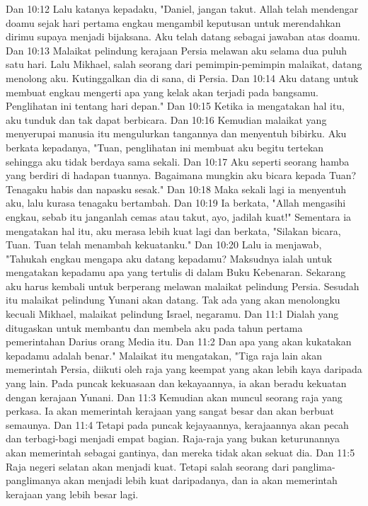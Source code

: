 Dan 10:12  Lalu katanya kepadaku, "Daniel, jangan takut. Allah telah mendengar doamu sejak hari pertama engkau mengambil keputusan untuk merendahkan dirimu supaya menjadi bijaksana. Aku telah datang sebagai jawaban atas doamu.
Dan 10:13  Malaikat pelindung kerajaan Persia melawan aku selama dua puluh satu hari. Lalu Mikhael, salah seorang dari pemimpin-pemimpin malaikat, datang menolong aku. Kutinggalkan dia di sana, di Persia.
Dan 10:14  Aku datang untuk membuat engkau mengerti apa yang kelak akan terjadi pada bangsamu. Penglihatan ini tentang hari depan."
Dan 10:15  Ketika ia mengatakan hal itu, aku tunduk dan tak dapat berbicara.
Dan 10:16  Kemudian malaikat yang menyerupai manusia itu mengulurkan tangannya dan menyentuh bibirku. Aku berkata kepadanya, "Tuan, penglihatan ini membuat aku begitu tertekan sehingga aku tidak berdaya sama sekali.
Dan 10:17  Aku seperti seorang hamba yang berdiri di hadapan tuannya. Bagaimana mungkin aku bicara kepada Tuan? Tenagaku habis dan napasku sesak."
Dan 10:18  Maka sekali lagi ia menyentuh aku, lalu kurasa tenagaku bertambah.
Dan 10:19  Ia berkata, "Allah mengasihi engkau, sebab itu janganlah cemas atau takut, ayo, jadilah kuat!" Sementara ia mengatakan hal itu, aku merasa lebih kuat lagi dan berkata, "Silakan bicara, Tuan. Tuan telah menambah kekuatanku."
Dan 10:20  Lalu ia menjawab, "Tahukah engkau mengapa aku datang kepadamu? Maksudnya ialah untuk mengatakan kepadamu apa yang tertulis di dalam Buku Kebenaran. Sekarang aku harus kembali untuk berperang melawan malaikat pelindung Persia. Sesudah itu malaikat pelindung Yunani akan datang. Tak ada yang akan menolongku kecuali Mikhael, malaikat pelindung Israel, negaramu.
Dan 11:1  Dialah yang ditugaskan untuk membantu dan membela aku pada tahun pertama pemerintahan Darius orang Media itu.
Dan 11:2  Dan apa yang akan kukatakan kepadamu adalah benar." Malaikat itu mengatakan, "Tiga raja lain akan memerintah Persia, diikuti oleh raja yang keempat yang akan lebih kaya daripada yang lain. Pada puncak kekuasaan dan kekayaannya, ia akan beradu kekuatan dengan kerajaan Yunani.
Dan 11:3  Kemudian akan muncul seorang raja yang perkasa. Ia akan memerintah kerajaan yang sangat besar dan akan berbuat semaunya.
Dan 11:4  Tetapi pada puncak kejayaannya, kerajaannya akan pecah dan terbagi-bagi menjadi empat bagian. Raja-raja yang bukan keturunannya akan memerintah sebagai gantinya, dan mereka tidak akan sekuat dia.
Dan 11:5  Raja negeri selatan akan menjadi kuat. Tetapi salah seorang dari panglima-panglimanya akan menjadi lebih kuat daripadanya, dan ia akan memerintah kerajaan yang lebih besar lagi.

